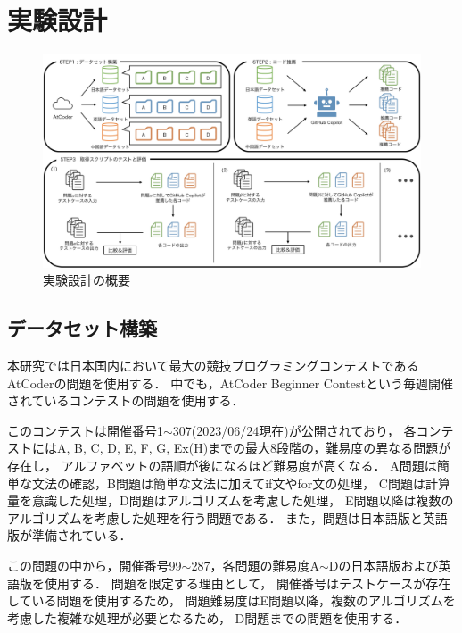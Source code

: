 \section{実験設計\label{approach}}
  \begin{figure}[t]
    \centering
    \includegraphics[width=\linewidth]{image/system.jpg}
    \caption{実験設計の概要}
    \label{experiment_design}
  \end{figure}
  
  \subsection{データセット構築\label{build_dataset}}
    本研究では日本国内において最大の競技プログラミングコンテストであるAtCoder\cite{AtCoder}の問題を使用する．
    中でも，AtCoder Beginner Contestという毎週開催されているコンテストの問題を使用する．
    
    このコンテストは開催番号1${\sim}$307(2023/06/24現在)が公開されており，
    各コンテストにはA, B, C, D, E, F, G, Ex(H)までの最大8段階の，難易度の異なる問題が存在し，
    アルファベットの語順が後になるほど難易度が高くなる．
    A問題は簡単な文法の確認，B問題は簡単な文法に加えてif文やfor文の処理，
    C問題は計算量を意識した処理，D問題はアルゴリズムを考慮した処理，
    E問題以降は複数のアルゴリズムを考慮した処理を行う問題である．
    また，問題は日本語版と英語版が準備されている．
    
    この問題の中から，開催番号99${\sim}$287，各問題の難易度A${\sim}$Dの日本語版および英語版を使用する．
    問題を限定する理由として，
    開催番号はテストケースが存在している問題を使用するため，
    問題難易度はE問題以降，複数のアルゴリズムを考慮した複雑な処理が必要となるため，
    D問題までの問題を使用する．
    
